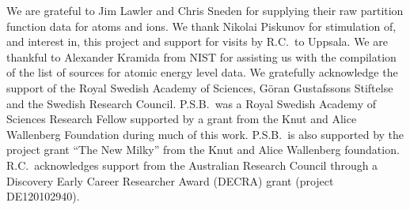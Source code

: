 \documentclass[traditabstract]{aa} %
\begin{document}
\begin{acknowledgements}
We are grateful to Jim Lawler and Chris Sneden for supplying their raw partition function data for atoms and ions.  We thank Nikolai Piskunov for stimulation of, and interest in, this project and support for visits by R.C.\ to Uppsala.  We are thankful to Alexander Kramida from NIST for assisting us with the compilation of the list of sources for atomic energy level data. We gratefully acknowledge the support of the Royal Swedish Academy of Sciences,  G{\"o}ran Gustafssons Stiftelse and the Swedish Research Council.  P.S.B.\ was a Royal Swedish Academy of Sciences Research Fellow supported by a grant from the Knut and Alice Wallenberg Foundation during much of this work.  P.S.B.\ is also supported by the project grant “The New Milky” from the Knut and Alice Wallenberg foundation.  R.C.\ acknowledges support from the Australian Research Council through a Discovery Early Career Researcher Award (DECRA) grant (project DE120102940).  
\end{acknowledgements}

 

\end{document}
